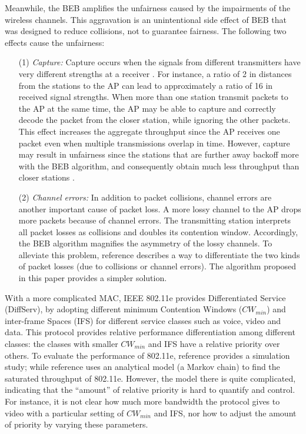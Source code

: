 \documentclass[letterpaper, 10 pt, conference]{ieeeconf}
\begin{document}
Meanwhile, the BEB amplifies the unfairness caused by the impairments of the wireless channels. This aggravation is an unintentional side
effect of BEB that was designed to reduce collisions, not to guarantee fairness. The following two effects 
cause the unfairness:

\begin{itemize}

\item [(1)] {\em Capture:} Capture occurs when the signals from different
transmitters have very different strengths at a receiver \cite{Capture}.
For instance, a ratio of 2 in distances from the stations to the AP can lead to approximately
a ratio of 16 in received signal strengths. When more than one
station transmit packets to the AP at the same time, the AP may be able to capture and
correctly decode the packet from the closer station, while ignoring
the other packets. This effect increases
the aggregate throughput since the AP receives one packet even when multiple transmissions
overlap in time. However, capture may result in unfairness since the stations that are further away backoff
more with the BEB algorithm, and consequently obtain much less throughput than closer stations
\cite{sniff_capture}.

\item [(2)]  {\em Channel errors:} In addition to packet collisions, channel errors are another
important cause of packet loss. A more lossy channel to the AP drops more packets because of channel errors.
The transmitting station interprets all packet losses as collisions
and doubles its contention window. Accordingly, the BEB algorithm magnifies
the asymmetry of the lossy channels.
To alleviate this problem, reference \cite{Pang_loss_differentiation}
describes a way to differentiate the two kinds of packet losses (due
to collisions or channel errors). The algorithm proposed in
this paper provides a simpler solution.

\end{itemize}

With a more complicated MAC, IEEE 802.11e \cite{80211e} provides
Differentiated Service (DiffServ), by adopting different minimum Contention
Windows ($CW_{min}$) and inter-frame Spaces (IFS) for different service classes
such as voice, video and data. This protocol provides relative performance
differentiation among different classes: the classes with smaller $CW_{min}$ 
and IFS have a relative priority over others. To evaluate the performance of
802.11e, reference \cite{EDCF_sim} provides a simulation study; while
reference \cite{Saturated_80211e} uses an analytical model (a Markov
chain) to find the saturated throughput of 802.11e. However, the model
there is quite complicated, indicating that the {}``amount'' of
relative priority is hard to quantify and control. For instance, it is
not clear how much more bandwidth the protocol gives to video with a particular setting of $CW_{min}$ and IFS, nor
how to adjust the amount of priority by varying these parameters.
\end{document}
